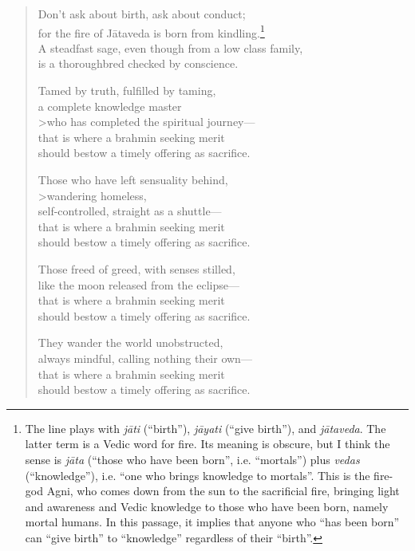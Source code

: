 \documentclass[12pt,openany]{book}%
\begin{document}
\begin{verse}%
Don’t ask about birth, ask about conduct; \\
for the fire of \textsanskrit{Jātaveda} is born from kindling.\footnote{The line plays with \textit{\textsanskrit{jāti}} (“birth”), \textit{\textsanskrit{jāyati}} (“give birth”), and \textit{\textsanskrit{jātaveda}}. The latter term is a Vedic word for fire. Its meaning is obscure, but I think the sense is \textit{\textsanskrit{jāta}} (“those who have been born”, i.e. “mortals”) plus \textit{vedas} (“knowledge”), i.e. “one who brings knowledge to mortals”. This is the fire-god Agni, who comes down from the sun to the sacrificial fire, bringing light and awareness and Vedic knowledge to those who have been born, namely mortal humans. In this passage, it implies that anyone who “has been born” can “give birth” to “knowledge” regardless of their “birth”. } \\
A steadfast sage, even though from a low class family, \\
is a thoroughbred checked by conscience. 

Tamed by truth, fulfilled by taming, \\
a complete knowledge master \\>who has completed the spiritual journey—\\
that is where a brahmin seeking merit \\
should bestow a timely offering as sacrifice. 

Those who have left sensuality behind, \\>wandering homeless, \\
self-controlled, straight as a shuttle—\\
that is where a brahmin seeking merit \\
should bestow a timely offering as sacrifice. 

Those freed of greed, with senses stilled, \\
like the moon released from the eclipse—\\
that is where a brahmin seeking merit \\
should bestow a timely offering as sacrifice. 

They wander the world unobstructed, \\
always mindful, calling nothing their own—\\
that is where a brahmin seeking merit \\
should bestow a timely offering as sacrifice. 


\end{verse}
\end{document}
